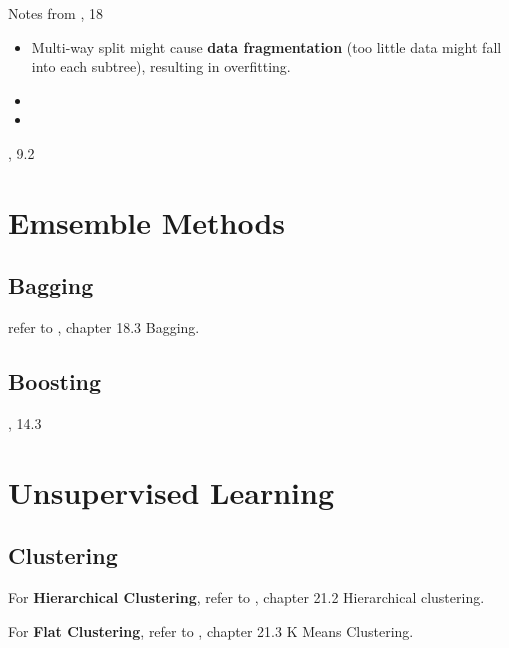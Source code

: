 \documentclass[8pt,letterpaper]{book}
\begin{document}
Notes from \cite{Murphy22}, 18 \newline
\begin{itemize}
    \item Multi-way split might cause \textbf{data fragmentation} (too little data might fall into each subtree), resulting in overfitting.
    \item 
    \item 
\end{itemize}


\cite{HasTibFri17}, 9.2 \newline

\chapter{Emsemble Methods}
\section{Bagging}
refer to \cite{Murphy22}, chapter 18.3 Bagging. \newline
\section{Boosting}
\cite{Bishop06}, 14.3 \newline

\chapter{Unsupervised Learning}
\section{Clustering}
For \textbf{Hierarchical Clustering}, refer to \cite{Murphy22}, chapter 21.2 Hierarchical clustering. \newline

For \textbf{Flat Clustering}, refer to \cite{Murphy22}, chapter 21.3 K Means Clustering. \newline














\end{document}
